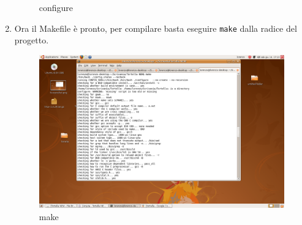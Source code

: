 \begin{enumerate}
\begin{figure}[H]
\begin{center}
\caption{configure}
\label{configure}
\end{center}
\end{figure}
\item Ora il Makefile è pronto, per compilare basta eseguire \lstinline{make} dalla radice del progetto.
\begin{figure}[H]
\begin{center}
\includegraphics[scale=0.5]{etc/make}
\caption{make}
\label{make}
\end{center}
\end{figure}
\end{enumerate}
